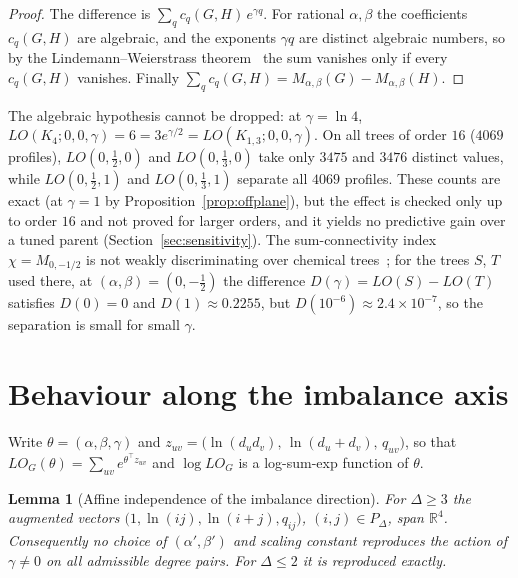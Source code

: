 \documentclass[a5paper, 10pt]{article}
\theoremstyle{plain}
\newtheorem{lemma}{Lemma}
\theoremstyle{remark}
\theoremstyle{definition}
\begin{document}
  \begin{proof}
  The difference is $\sum_q c_q(G,H)\, e^{\gamma q}$. For rational
  $\alpha, \beta$ the coefficients $c_q(G,H)$ are algebraic, and the
  exponents $\gamma q$ are distinct algebraic numbers, so by the
  Lindemann--Weierstrass theorem~\cite{Baker1975} the sum vanishes only
  if every $c_q(G,H)$ vanishes. Finally
  $\sum_q c_q(G,H) = M_{\alpha,\beta}(G) - M_{\alpha,\beta}(H)$.
  \end{proof}

  The algebraic hypothesis cannot be dropped: at $\gamma = \ln 4$,
  $LO(K_4;0,0,\gamma) = 6 = 3e^{\gamma/2} = LO(K_{1,3};0,0,\gamma)$. On
  all trees of order $16$ ($4069$ profiles), $LO(0,\tfrac12,0)$ and
  $LO(0,\tfrac13,0)$ take only $3475$ and $3476$ distinct values, while
  $LO(0,\tfrac12,1)$ and $LO(0,\tfrac13,1)$ separate all $4069$ profiles. These counts are exact (at
  $\gamma = 1$ by Proposition~\ref{prop:offplane}), but the effect is checked
  only up to order $16$ and not proved for larger orders, and it
  yields no predictive gain over a tuned parent
  (Section~\ref{sec:sensitivity}). The
  sum-connectivity index $\chi = M_{0,-1/2}$ is not weakly discriminating
  over chemical trees~\cite[Example~2.2]{RadaRodriguezSigarreta2022Weak};
  for the trees $S$, $T$ used there, at $(\alpha,\beta) = (0,-\tfrac12)$
  the difference $D(\gamma) = LO(S) - LO(T)$ satisfies $D(0) = 0$ and
  $D(1) \approx 0.2255$, but $D(10^{-6}) \approx 2.4 \times 10^{-7}$, so
  the separation is small for small $\gamma$.

\section{Behaviour along the imbalance axis}\label{sec:geometry}

  Write $\theta = (\alpha, \beta, \gamma)$ and
  $z_{uv} = \bigl(\ln(d_u d_v),\, \ln(d_u + d_v),\, q_{uv}\bigr)$, so that
  $LO_G(\theta) = \sum_{uv} e^{\theta^{\top} z_{uv}}$ and
  $\log LO_G$ is a log-sum-exp function of $\theta$.

  \begin{lemma}[Affine independence of the imbalance direction]\label{prop:indep}
  For $\Delta \ge 3$ the augmented vectors
  $\bigl(1, \ln(ij), \ln(i+j), q_{ij}\bigr)$, $(i,j) \in P_{\Delta}$,
  span $\mathbb{R}^4$. Consequently no choice of $(\alpha', \beta')$ and
  scaling constant reproduces the action of $\gamma \neq 0$ on all
  admissible degree pairs. For $\Delta \le 2$ it is reproduced exactly.
  \end{lemma}
\end{document}
